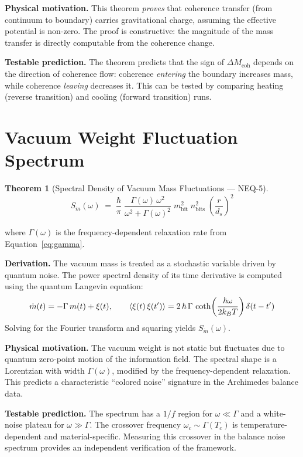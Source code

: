 \documentclass[11pt,a4paper]{article}
\newtheorem{theorem}{Theorem}[section]
\theoremstyle{remark}
\begin{document}
\textbf{Physical motivation.}\quad
This theorem \emph{proves} that coherence transfer (from continuum to boundary) carries gravitational charge, assuming the effective potential is non-zero.  The proof is constructive: the magnitude of the mass transfer is directly computable from the coherence change.

\textbf{Testable prediction.}\quad
The theorem predicts that the sign of $\Delta M_{\text{coh}}$ depends on the direction of coherence flow: coherence \emph{entering} the boundary increases mass, while coherence \emph{leaving} decreases it.  This can be tested by comparing heating (reverse transition) and cooling (forward transition) runs.

\section{Vacuum Weight Fluctuation Spectrum}
\label{sec:novel5}

\begin{theorem}[Spectral Density of Vacuum Mass Fluctuations --- NEQ-5]
\begin{equation}\label{eq:novel5}
    S_{\dot{m}}(\omega) \;=\; \frac{\hbar}{\pi}\;
        \frac{\Gamma(\omega)\,\omega^2}{\omega^2 + \Gamma(\omega)^2}\;
        m_{\text{bit}}^2\; n_{\text{bits}}^2\;
        \left(\frac{r}{d_s}\right)^{\!2}
\end{equation}
\end{theorem}

where $\Gamma(\omega)$ is the frequency-dependent relaxation rate from Equation~\eqref{eq:gamma}.

\textbf{Derivation.}\quad
The vacuum mass is treated as a stochastic variable driven by quantum noise.  The power spectral density of its time derivative is computed using the quantum Langevin equation:
\[
    \dot{m}(t) = -\Gamma\, m(t) + \xi(t), \qquad
    \expval{\xi(t)\,\xi(t')} = 2\,\hbar\,\Gamma\,\coth\!\left(\frac{\hbar\omega}{2k_BT}\right)\delta(t-t')
\]
Solving for the Fourier transform and squaring yields $S_{\dot{m}}(\omega)$.

\textbf{Physical motivation.}\quad
The vacuum weight is not static but fluctuates due to quantum zero-point motion of the information field.  The spectral shape is a Lorentzian with width $\Gamma(\omega)$, modified by the frequency-dependent relaxation.  This predicts a characteristic ``colored noise'' signature in the Archimedes balance data.

\textbf{Testable prediction.}\quad
The spectrum has a $1/f$ region for $\omega \ll \Gamma$ and a white-noise plateau for $\omega \gg \Gamma$.  The crossover frequency $\omega_c \sim \Gamma(T_c)$ is temperature-dependent and material-specific.  Measuring this crossover in the balance noise spectrum provides an independent verification of the framework.
\end{document}

